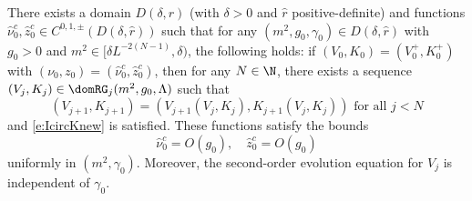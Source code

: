 \begin{theorem}
\label{thm:rhatflow}
There exists a domain $D(\delta, \hat r)$ (with $\delta > 0$ and $\hat r$
positive-definite) and functions $\hat\nu_0^c, \hat z_0^c \in C^{0,1,\pm}(D(\delta, \hat r))$
such that for any $(m^2, g_0, \gamma_0) \in D(\delta, \hat r)$
with $g_0 > 0$ and $m^2 \in [\delta L^{-2 (N - 1)}, \delta)$, the following holds:
if $(V_0, K_0) = (V^+_0, K^+_0)$ with $(\nu_0, z_0) = (\hat\nu_0^c, \hat z_0^c)$,
then for any $N \in \N$,
there exists a sequence $(V_j, K_j) \in \domRG_j(m^2, g_0, \Lambda)$ such that
\begin{equation}
	\label{e:VjKjDj-hat}
	(V_{j+1},K_{j+1}) = (V_{j+1}(V_j, K_j), K_{j+1}(V_j, K_j)) \text{ for all } j < N
\end{equation}
and \eqref{e:IcircKnew} is satisfied.
These functions satisfy the bounds
\begin{equation}
\label{e:hat-est}
\hat\nu_0^c = O(g_0),
\quad
\hat z_0^c = O(g_0)
\end{equation}
uniformly in $(m^2, \gamma_0)$.
Moreover, the second-order evolution equation for $V_j$ is independent of $\gamma_0$.
\end{theorem}
